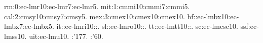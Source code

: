 \newfont rm:0:ec-lmr10:ec-lmr7:ec-lmr5.
\newmathfont mit:1:cmmi10:cmmi7:cmmi5.
\newmathfont cal:2:cmsy10:cmsy7:cmsy5.
\newmathfont mex:3:cmex10:cmex10:cmex10.
\newfam\itfam \newfam\slfam \newfam\bffam \newfam\ttfam
\newfont bf:\bffam:ec-lmbx10:ec-lmbx7:ec-lmbx5.
\newfont it:\itfam:ec-lmri10::.
\newfont sl:\slfam:ec-lmro10::.
\newfont tt:\ttfam:ec-lmtt10::.
\newtextfont sc:ec-lmcsc10.
\newtextfont ssf:ec-lmss10.
\newtextfont uit:ec-lmu10.
:'177.
:'60.
\rm
